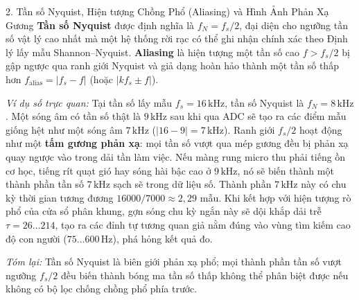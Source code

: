 \begin{feynmanbox}{2. Tần số Nyquist, Hiện tượng Chồng Phổ (Aliasing) và Hình Ảnh Phản Xạ Gương}
\textbf{Tần số Nyquist} được định nghĩa là $f_N = f_s/2$, đại diện cho ngưỡng tần số vật lý cao nhất mà một hệ thống rời rạc có thể ghi nhận chính xác theo Định lý lấy mẫu Shannon--Nyquist. \textbf{Aliasing} là hiện tượng một tần số cao $f > f_s/2$ bị gập ngược qua ranh giới Nyquist và giả dạng hoàn hảo thành một tần số thấp hơn $f_{\mathrm{alias}} = |f_s - f|$ (hoặc $|k f_s \pm f|$).

\emph{Ví dụ số trực quan:} Tại tần số lấy mẫu $f_s = 16\,\text{kHz}$, tần số Nyquist là $f_N = 8\,\text{kHz}$. Một sóng âm có tần số thật là $9\,\text{kHz}$ sau khi qua ADC sẽ tạo ra các điểm mẫu giống hệt như một sóng âm $7\,\text{kHz}$ ($|16 - 9| = 7\,\text{kHz}$). Ranh giới $f_s/2$ hoạt động như một \textbf{tấm gương phản xạ}: mọi tần số vượt qua mép gương đều bị phản xạ quay ngược vào trong dải tần làm việc. Nếu màng rung micro thu phải tiếng ồn cơ học, tiếng rít quạt gió hay sóng hài bậc cao ở $9\,\text{kHz}$, nó sẽ biến thành một thành phần tần số $7\,\text{kHz}$ sạch sẽ trong dữ liệu số. Thành phần $7\,\text{kHz}$ này có chu kỳ thời gian tương đương $16000 / 7000 \approx 2{,}29$ mẫu. Khi kết hợp với hiện tượng rò phổ của cửa sổ phân khung, gợn sóng chu kỳ ngắn này sẽ dội khắp dải trễ $\tau = 26 \ldots 214$, tạo ra các đỉnh tự tương quan giả nằm đúng vào vùng tìm kiếm cao độ con người ($75 \ldots 600\,\text{Hz}$), phá hỏng kết quả đo.

\emph{Tóm lại:} Tần số Nyquist là biên giới phản xạ phổ; mọi thành phần tần số vượt ngưỡng $f_s/2$ đều biến thành bóng ma tần số thấp không thể phân biệt được nếu không có bộ lọc chống chồng phổ phía trước.
\end{feynmanbox}

